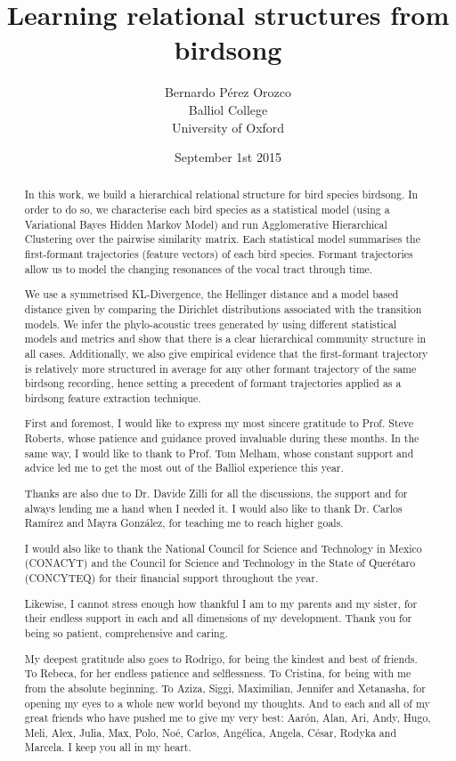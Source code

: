 \documentclass[pdftex,12pt,a4paper]{report}
\title{Learning relational structures from birdsong}
\author{Bernardo Pérez Orozco\\Balliol College\\University of Oxford}
\date{ September 1st 2015 }
\theoremstyle{definition}
\theoremstyle{remark}
\begin{document}
 

\begin{abstract}
In this work, we build a hierarchical relational structure for bird species birdsong. In order to do so, we characterise each bird species as a statistical model (using a Variational Bayes Hidden Markov Model) and run Agglomerative Hierarchical Clustering over the pairwise similarity matrix. Each statistical model summarises the first-formant trajectories (feature vectors) of each bird species. Formant trajectories allow us to model the changing resonances of the vocal tract through time.
\par We use a symmetrised KL-Divergence, the Hellinger distance and a model based distance given by comparing the Dirichlet distributions associated with the transition models. We infer the phylo-acoustic trees generated by using different statistical models and metrics and show that there is a clear hierarchical community structure in all cases. Additionally, we also give empirical evidence that the first-formant trajectory is relatively more structured in average for any other formant trajectory of the same birdsong recording, hence setting a precedent of formant trajectories applied as a birdsong feature extraction technique.
\end{abstract}

\renewcommand{\abstractname}{Acknowledgements}
\begin{abstract}
First and foremost, I would like to express my most sincere gratitude to Prof. Steve Roberts, whose patience and guidance proved invaluable during these months. In the same way, I would like to thank to Prof. Tom Melham, whose constant support and advice led me to get the most out of the Balliol experience this year.
\par Thanks are also due to Dr. Davide Zilli for all the discussions, the support and for always lending me a hand when I needed it. I would also like to thank Dr. Carlos Ramírez and Mayra González, for teaching me to reach higher goals.
\par I would also like to thank the National Council for Science and Technology in Mexico (CONACYT) and the Council for Science and Technology in the State of Querétaro (CONCYTEQ) for their financial support throughout the year.
\par Likewise, I cannot stress enough how thankful I am to my parents and my sister, for their endless support in each and all dimensions of my development. Thank you for being so patient, comprehensive and caring. 
\par My deepest gratitude also goes to Rodrigo, for being the kindest and best of friends. To Rebeca, for her endless patience and selflessness. To Cristina, for being with me from the absolute beginning. To Aziza, Siggi, Maximilian, Jennifer and Xetanasha, for opening my eyes to a whole new world beyond my thoughts. And to each and all of my great friends who have pushed me to give my very best: Aarón, Alan, Ari, Andy, Hugo, Meli, Alex, Julia, Max, Polo, Noé, Carlos, Angélica, Angela, César, Rodyka and Marcela. I keep you all in my heart.

\end{abstract}
\end{document}
